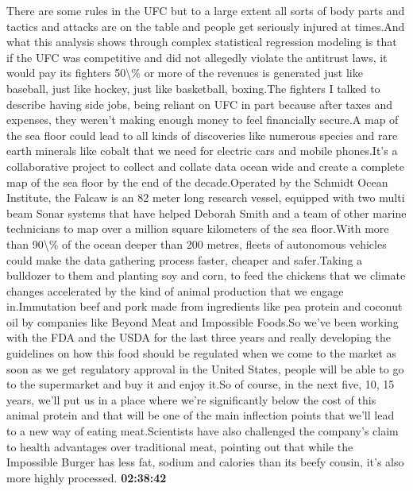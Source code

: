 \documentclass{article}%
\begin{document}
There are some rules in the UFC but to a large extent all sorts of body parts and tactics and attacks are on the table and people get seriously injured at times.And what this analysis shows through complex statistical regression modeling is that if the UFC was competitive and did not allegedly violate the antitrust laws, it would pay its fighters 50\textbackslash{}\% or more of the revenues is generated just like baseball, just like hockey, just like basketball, boxing.The fighters I talked to describe having side jobs, being reliant on UFC in part because after taxes and expenses, they weren't making enough money to feel financially secure.A map of the sea floor could lead to all kinds of discoveries like numerous species and rare earth minerals like cobalt that we need for electric cars and mobile phones.It's a collaborative project to collect and collate data ocean wide and create a complete map of the sea floor by the end of the decade.Operated by the Schmidt Ocean Institute, the Falcaw is an 82 meter long research vessel, equipped with two multi beam Sonar systems that have helped Deborah Smith and a team of other marine technicians to map over a million square kilometers of the sea floor.With more than 90\textbackslash{}\% of the ocean deeper than 200 metres, fleets of autonomous vehicles could make the data gathering process faster, cheaper and safer.Taking a bulldozer to them and planting soy and corn, to feed the chickens that we climate changes accelerated by the kind of animal production that we engage in.Immutation beef and pork made from ingredients like pea protein and coconut oil by companies like Beyond Meat and Impossible Foods.So we've been working with the FDA and the USDA for the last three years and really developing the guidelines on how this food should be regulated when we come to the market as soon as we get regulatory approval in the United States, people will be able to go to the supermarket and buy it and enjoy it.So of course, in the next five, 10, 15 years, we'll put us in a place where we're significantly below the cost of this animal protein and that will be one of the main inflection points that we'll lead to a new way of eating meat.Scientists have also challenged the company's claim to health advantages over traditional meat, pointing out that while the Impossible Burger has less fat, sodium and calories than its beefy cousin, it's also more highly processed.%
\textbf{02:38:42}%
\newline%
\end{document}
